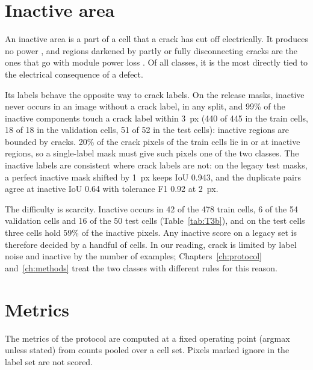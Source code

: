 
\section{Inactive area}\label{sec:bg_inactive}

An inactive area is a part of a cell that a crack has cut off electrically. It produces no power
\citep{haase2018crackwidth}, and regions darkened by partly or fully disconnecting cracks are the ones that go with module
power loss \citep{pratt2025ictas}. Of all classes, it is the most directly tied to the electrical consequence of a defect.

Its labels behave the opposite way to crack labels. On the release masks, inactive never occurs in an image without a crack
label, in any split, and 99\% of the inactive components touch a crack label within 3~px (440 of 445 in the train cells,
18 of 18 in the validation cells, 51 of 52 in the test cells): inactive regions are bounded by cracks. 20\% of the crack
pixels of the train cells lie in or at inactive regions, so a single-label mask must give such pixels one of the two classes.
The inactive labels are consistent where crack labels are not: on the legacy test masks, a perfect inactive mask shifted by
1~px keeps IoU 0.943, and the duplicate pairs agree at inactive IoU 0.64 with tolerance F1 0.92 at 2~px.

The difficulty is scarcity. Inactive occurs in 42 of the 478 train cells, 6 of the 54 validation cells and 16 of the 50 test
cells (Table~\ref{tab:T3b}), and on the test cells three cells hold 59\% of the inactive pixels. Any inactive score on a
legacy set is therefore decided by a handful of cells. In our reading, crack is limited by label noise and inactive by the
number of examples; Chapters~\ref{ch:protocol} and~\ref{ch:methods} treat the two classes with different rules for this
reason.

\section{Metrics}\label{sec:bg_metrics}

The metrics of the protocol are computed at a fixed operating point (argmax unless stated) from counts pooled over a cell
set. Pixels marked ignore in the label set are not scored.


